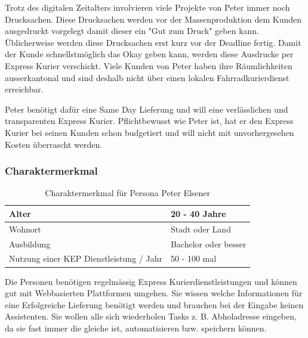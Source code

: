 \begin{description}
Trotz des digitalen Zeitalters involvieren viele Projekte von Peter immer noch Drucksachen. Diese Drucksachen werden vor der Massenproduktion dem Kunden ausgedruckt vorgelegt damit dieser ein "Gut zum Druck" geben kann. Üblicherweise werden diese Drucksachen erst kurz vor der Deadline fertig. Damit der Kunde schnellstmöglich das Okay geben kann, werden diese Ausdrucke per Express Kurier verschickt. Viele Kunden von Peter haben ihre Räumlichkeiten ausserkantonal und sind deshalb nicht über einen lokalen Fahrradkurierdienst erreichbar.

Peter benötigt dafür eine Same Day Lieferung und will eine verlässlichen und transparenten Express Kurier. Pflichtbewusst wie Peter ist, hat er den Express Kurier bei seinen Kunden schon budgetiert und will nicht mit unvorhergesehen Kosten überrascht werden.

\subsubsection{Charaktermerkmal}
\begin{table}[]
\centering

\label{my-label}
\begin{tabular}{|l|l|}
\hline
Alter                                   & 20 - 40 Jahre        \\ \hline
Wohnort                                 & Stadt oder Land         \\ \hline
Ausbildung                              & Bachelor oder besser \\ \hline
Nutzung einer KEP Dienstleistung / Jahr & 50 - 100 mal            \\ \hline
\end{tabular}
\caption{Charaktermerkmal für Persona Peter Elsener}
\end{table}

Die Personen benötigen regelmässig Express Kurierdienstleistungen und können gut mit Webbasierten Plattformen umgehen. Sie wissen welche Informationen für eine Erfolgreiche Lieferung benötigt werden und brauchen bei der Eingabe keinen Assistenten. Sie wollen alle sich wiederholen Tasks z. B. \glqq Abholadresse eingeben\grqq, da sie fast immer die gleiche ist, automatisieren bzw. speichern können.


\end{description}
